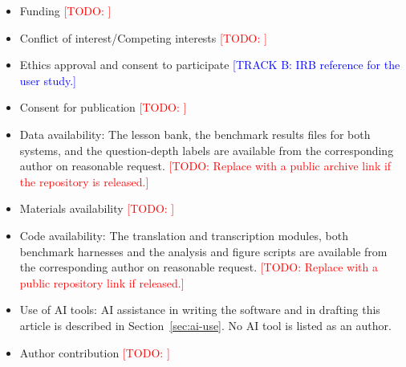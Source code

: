 \documentclass[pdflatex,sn-mathphys-num]{sn-jnl}%
\newcommand{\todo}[1]{\textcolor{red}{[TODO: #1]}}
\newcommand{\trackb}[1]{\textcolor{blue}{[TRACK B: #1]}}
\theoremstyle{thmstyleone}%
\theoremstyle{thmstyletwo}%
\theoremstyle{thmstylethree}%
\begin{document}
\begin{itemize}
\item Funding \todo{}
\item Conflict of interest/Competing interests \todo{}
\item Ethics approval and consent to participate \trackb{IRB reference for the user study.}
\item Consent for publication \todo{}
\item Data availability: The lesson bank, the benchmark results files for both systems, and the
question-depth labels are available from the corresponding author on reasonable request.
\todo{Replace with a public archive link if the repository is released.}
\item Materials availability \todo{}
\item Code availability: The translation and transcription modules, both benchmark harnesses and
the analysis and figure scripts are available from the corresponding author on reasonable request.
\todo{Replace with a public repository link if released.}
\item Use of AI tools: AI assistance in writing the software and in drafting this article is
described in Section~\ref{sec:ai-use}. No AI tool is listed as an author.
\item Author contribution \todo{}
\end{itemize}
\end{document}
